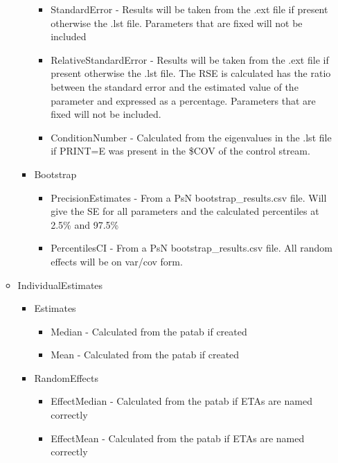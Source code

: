\begin{itemize}
\begin{itemize}
\begin{itemize}
\begin{itemize}
                    \item StandardError - Results will be taken from the .ext file if present otherwise the .lst file. Parameters that are fixed will not be included
                    \item RelativeStandardError - Results will be taken from the .ext file if present otherwise the .lst file. The RSE is calculated has the ratio between the standard error and the estimated value of the parameter and expressed as a percentage. Parameters that are fixed will not be included.
                    \item ConditionNumber - Calculated from the eigenvalues in the .lst file if PRINT=E was present in the \$COV of the control stream.
                \end{itemize}
                \item Bootstrap
                \begin{itemize}
                    \item PrecisionEstimates - From a PsN bootstrap\_results.csv file. Will give the SE for all parameters and the calculated percentiles at 2.5\% and 97.5\%
                    \item PercentilesCI - From a PsN bootstrap\_results.csv file. All random effects will be on var/cov form.
                \end{itemize}
            \end{itemize}
            \item IndividualEstimates
            \begin{itemize}
                \item Estimates
                \begin{itemize}
                    \item Median - Calculated from the patab if created
                    \item Mean - Calculated from the patab if created
                \end{itemize}
                \item RandomEffects
                \begin{itemize}
                    \item EffectMedian - Calculated from the patab if ETAs are named correctly
                    \item EffectMean - Calculated from the patab if ETAs are named correctly
                \end{itemize}
            \end{itemize}

\end{itemize}
\end{itemize}
